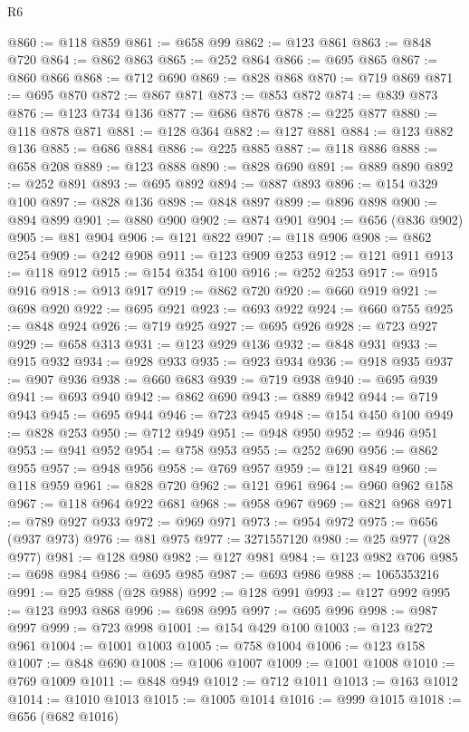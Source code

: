 \begin{lexlean}{R6}
\begin{coremodule}
@860 := @118 @859
@861 := @658 @99
@862 := @123 @861
@863 := @848 @720
@864 := @862 @863
@865 := @252 @864
@866 := @695 @865
@867 := @860 @866
@868 := @712 @690
@869 := @828 @868
@870 := @719 @869
@871 := @695 @870
@872 := @867 @871
@873 := @853 @872
@874 := @839 @873
@876 := @123 @734 @136
@877 := @686 @876
@878 := @225 @877
@880 := @118 @878 @871
@881 := @128 @364
@882 := @127 @881
@884 := @123 @882 @136
@885 := @686 @884
@886 := @225 @885
@887 := @118 @886
@888 := @658 @208
@889 := @123 @888
@890 := @828 @690
@891 := @889 @890
@892 := @252 @891
@893 := @695 @892
@894 := @887 @893
@896 := @154 @329 @100
@897 := @828 @136
@898 := @848 @897
@899 := @896 @898
@900 := @894 @899
@901 := @880 @900
@902 := @874 @901
@904 := @656 (@836 @902)
@905 := @81 @904
@906 := @121 @822
@907 := @118 @906
@908 := @862 @254
@909 := @242 @908
@911 := @123 @909 @253
@912 := @121 @911
@913 := @118 @912
@915 := @154 @354 @100
@916 := @252 @253
@917 := @915 @916
@918 := @913 @917
@919 := @862 @720
@920 := @660 @919
@921 := @698 @920
@922 := @695 @921
@923 := @693 @922
@924 := @660 @755
@925 := @848 @924
@926 := @719 @925
@927 := @695 @926
@928 := @723 @927
@929 := @658 @313
@931 := @123 @929 @136
@932 := @848 @931
@933 := @915 @932
@934 := @928 @933
@935 := @923 @934
@936 := @918 @935
@937 := @907 @936
@938 := @660 @683
@939 := @719 @938
@940 := @695 @939
@941 := @693 @940
@942 := @862 @690
@943 := @889 @942
@944 := @719 @943
@945 := @695 @944
@946 := @723 @945
@948 := @154 @450 @100
@949 := @828 @253
@950 := @712 @949
@951 := @948 @950
@952 := @946 @951
@953 := @941 @952
@954 := @758 @953
@955 := @252 @690
@956 := @862 @955
@957 := @948 @956
@958 := @769 @957
@959 := @121 @849
@960 := @118 @959
@961 := @828 @720
@962 := @121 @961
@964 := @960 @962 @158
@967 := @118 @964 @922 @681
@968 := @958 @967
@969 := @821 @968
@971 := @789 @927 @933
@972 := @969 @971
@973 := @954 @972
@975 := @656 (@937 @973)
@976 := @81 @975
@977 := 3271557120
@980 := @25 @977 (@28 @977)
@981 := @128 @980
@982 := @127 @981
@984 := @123 @982 @706
@985 := @698 @984
@986 := @695 @985
@987 := @693 @986
@988 := 1065353216
@991 := @25 @988 (@28 @988)
@992 := @128 @991
@993 := @127 @992
@995 := @123 @993 @868
@996 := @698 @995
@997 := @695 @996
@998 := @987 @997
@999 := @723 @998
@1001 := @154 @429 @100
@1003 := @123 @272 @961
@1004 := @1001 @1003
@1005 := @758 @1004
@1006 := @123 @158
@1007 := @848 @690
@1008 := @1006 @1007
@1009 := @1001 @1008
@1010 := @769 @1009
@1011 := @848 @949
@1012 := @712 @1011
@1013 := @163 @1012
@1014 := @1010 @1013
@1015 := @1005 @1014
@1016 := @999 @1015
@1018 := @656 (@682 @1016)

\end{coremodule}
\end{lexlean}
